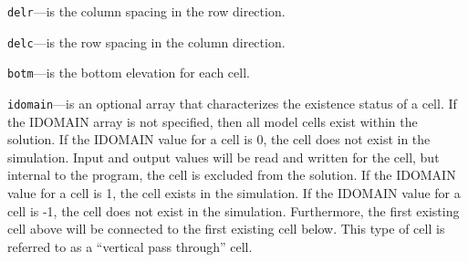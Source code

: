 \begin{description}
\item \texttt{delr}---is the column spacing in the row direction.

\item \texttt{delc}---is the row spacing in the column direction.

\item \texttt{botm}---is the bottom elevation for each cell.

\item \texttt{idomain}---is an optional array that characterizes the existence status of a cell.  If the IDOMAIN array is not specified, then all model cells exist within the solution.  If the IDOMAIN value for a cell is 0, the cell does not exist in the simulation.  Input and output values will be read and written for the cell, but internal to the program, the cell is excluded from the solution.  If the IDOMAIN value for a cell is 1, the cell exists in the simulation.  If the IDOMAIN value for a cell is -1, the cell does not exist in the simulation.  Furthermore, the first existing cell above will be connected to the first existing cell below.  This type of cell is referred to as a ``vertical pass through'' cell.

\end{description}

